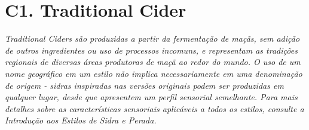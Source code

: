 \section*{C1. Traditional Cider}
\textit{Traditional Ciders são produzidas a partir da fermentação de maçãs, sem adição de outros ingredientes ou uso de processos incomuns, e representam as tradições regionais de diversas áreas produtoras de maçã ao redor do mundo. O uso de um nome geográfico em um estilo não implica necessariamente em uma denominação de origem - sidras inspiradas nas versões originais podem ser produzidas em qualquer lugar, desde que apresentem um perfil sensorial semelhante. Para mais detalhes sobre as características sensoriais aplicáveis a todos os estilos, consulte a Introdução aos Estilos de Sidra e Perada.}